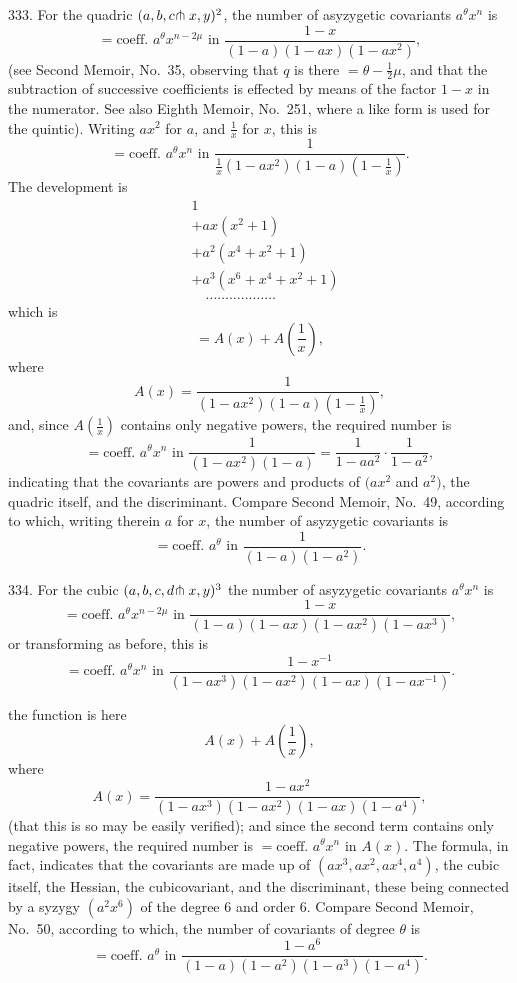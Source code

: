 \documentclass[11pt,a4paper]{article}
\begin{document}
333. For the quadric $(a, b, c\hspace{-0.2em}\pitchfork x, y)^{2}$, the number of asyzygetic covariants $a^{\theta}x^{n}$ is
\[
= \text{coeff. } a^{\theta}x^{n-2\mu} \text{ in } \frac{1-x}{(1-a)(1-ax)(1-ax^{2})},
\]
(see Second Memoir, No.~35, observing that $q$ is there $=\theta - \frac{1}{2}\mu$, and that the subtraction of successive coefficients is effected by means of the factor $1-x$ in the numerator. See also Eighth Memoir, No.~251, where a like form is used for the quintic). Writing $ax^{2}$ for $a$, and $\frac{1}{x}$ for $x$, this is
\[
= \text{coeff. } a^{\theta}x^{n} \text{ in } \frac{1}{\frac{1}{x}(1-ax^{2})(1-a)(1-\frac{1}{x})}.
\]
The development is
\begin{align*}
&1\\
&+ ax(x^{2}+1)\\
&+ a^{2}(x^{4}+x^{2}+1)\\
&+ a^{3}(x^{6}+x^{4}+x^{2}+1)\\
&\quad\ldots\ldots\ldots\ldots\ldots\ldots
\end{align*}
which is
\[
= A(x) + A\!\left(\frac{1}{x}\right),
\]
where
\[
A(x) = \frac{1}{(1-ax^{2})(1-a)(1-\frac{1}{x})},
\]
and, since $A(\frac{1}{x})$ contains only negative powers, the required number is
\[
= \text{coeff. } a^{\theta}x^{n} \text{ in } \frac{1}{(1-ax^{2})(1-a)} = \frac{1}{1-aa^{2}} \cdot \frac{1}{1-a^{2}},
\]
indicating that the covariants are powers and products of $(ax^{2}$ and $a^{2})$, the quadric itself, and the discriminant. Compare Second Memoir, No.~49, according to which, writing therein $a$ for $x$, the number of asyzygetic covariants is
\[
= \text{coeff. } a^{\theta} \text{ in } \frac{1}{(1-a)(1-a^{2})}.
\]

334. For the cubic $(a, b, c, d\hspace{-0.2em}\pitchfork x, y)^{3}$ the number of asyzygetic covariants $a^{\theta}x^{n}$ is
\[
= \text{coeff. } a^{\theta}x^{n-2\mu} \text{ in } \frac{1-x}{(1-a)(1-ax)(1-ax^{2})(1-ax^{3})},
\]
or transforming as before, this is
\[
= \text{coeff. } a^{\theta}x^{n} \text{ in } \frac{1-x^{-1}}{(1-ax^{3})(1-ax^{2})(1-ax)(1-ax^{-1})}.
\]

\newpage
\setcounter{page}{339}

the function is here
\[
A(x) + A\!\left(\frac{1}{x}\right),
\]
where
\[
A(x) = \frac{1-ax^{2}}{(1-ax^{3})(1-ax^{2})(1-ax)(1-a^{4})},
\]
(that this is so may be easily verified); and since the second term contains only negative powers, the required number is $= \text{coeff. } a^{\theta}x^{n}$ in $A(x)$. The formula, in fact, indicates that the covariants are made up of $(ax^{3}, ax^{2}, ax^{4}, a^{4})$, the cubic itself, the Hessian, the cubicovariant, and the discriminant, these being connected by a syzygy $(a^{2}x^{6})$ of the degree 6 and order 6. Compare Second Memoir, No.~50, according to which, the number of covariants of degree $\theta$ is
\[
= \text{coeff. } a^{\theta} \text{ in } \frac{1-a^{6}}{(1-a)(1-a^{2})(1-a^{3})(1-a^{4})}.
\]
\end{document}
